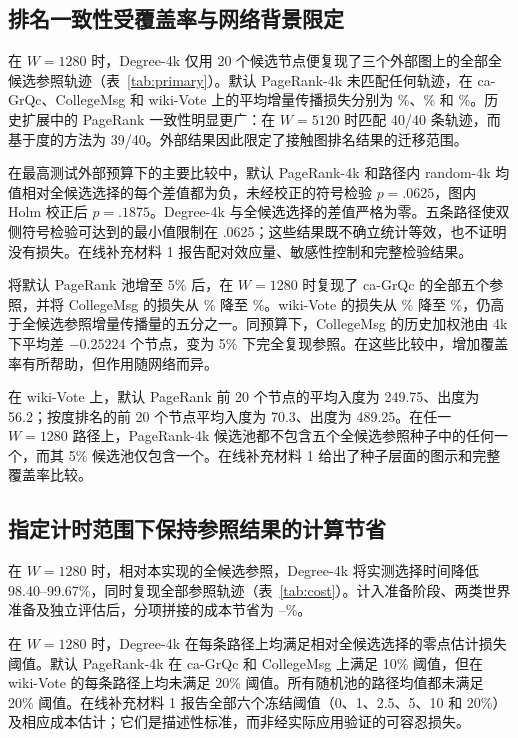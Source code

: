 \documentclass[smallextended]{svjour3}
\begin{document}
\subsection{排名一致性受覆盖率与网络背景限定}
在 $W=1280$ 时，Degree-4k 仅用 20 个候选节点便复现了三个外部图上的全部全候选参照轨迹（表~\ref{tab:primary}）。默认 PageRank-4k 未匹配任何轨迹，在 ca-GrQc、CollegeMsg 和 wiki-Vote 上的平均增量传播损失分别为 \GrqcPRLoss{}\%、\CollegePRLoss{}\% 和 \WikiPRLoss{}\%。历史扩展中的 PageRank 一致性明显更广：在 $W=5120$ 时匹配 40/40 条轨迹，而基于度的方法为 39/40。外部结果因此限定了接触图排名结果的迁移范围。


在最高测试外部预算下的主要比较中，默认 PageRank-4k 和路径内 random-4k 均值相对全候选选择的每个差值都为负，未经校正的符号检验 $p=.0625$，图内 Holm 校正后 $p=.1875$。Degree-4k 与全候选选择的差值严格为零。五条路径使双侧符号检验可达到的最小值限制在 .0625；这些结果既不确立统计等效，也不证明没有损失。在线补充材料 1 报告配对效应量、敏感性控制和完整检验结果。

将默认 PageRank 池增至 5\% 后，在 $W=1280$ 时复现了 ca-GrQc 的全部五个参照，并将 CollegeMsg 的损失从 \CollegePRLoss{}\% 降至 \CollegePRfiveLoss{}\%。wiki-Vote 的损失从 \WikiPRLoss{}\% 降至 \WikiPRfiveLoss{}\%，仍高于全候选参照增量传播量的五分之一。同预算下，CollegeMsg 的历史加权池由 4k 下平均差 $-0.25224$ 个节点，变为 5\% 下完全复现参照。在这些比较中，增加覆盖率有所帮助，但作用随网络而异。

在 wiki-Vote 上，默认 PageRank 前 20 个节点的平均入度为 249.75、出度为 56.2；按度排名的前 20 个节点平均入度为 70.3、出度为 489.25。在任一 $W=1280$ 路径上，PageRank-4k 候选池都不包含五个全候选参照种子中的任何一个，而其 5\% 候选池仅包含一个。在线补充材料 1 给出了种子层面的图示和完整覆盖率比较。

\subsection{指定计时范围下保持参照结果的计算节省}
在 $W=1280$ 时，相对本实现的全候选参照，Degree-4k 将实测选择时间降低 98.40--99.67\%，同时复现全部参照轨迹（表~\ref{tab:cost}）。计入准备阶段、两类世界准备及独立评估后，分项拼接的成本节省为 \CollegeDegreeSaving{}--\WikiDegreeSaving{}\%。


在 $W=1280$ 时，Degree-4k 在每条路径上均满足相对全候选选择的零点估计损失阈值。默认 PageRank-4k 在 ca-GrQc 和 CollegeMsg 上满足 10\% 阈值，但在 wiki-Vote 的每条路径上均未满足 20\% 阈值。所有随机池的路径均值都未满足 20\% 阈值。在线补充材料 1 报告全部六个冻结阈值（0、1、2.5、5、10 和 20\%）及相应成本估计；它们是描述性标准，而非经实际应用验证的可容忍损失。
\end{document}

